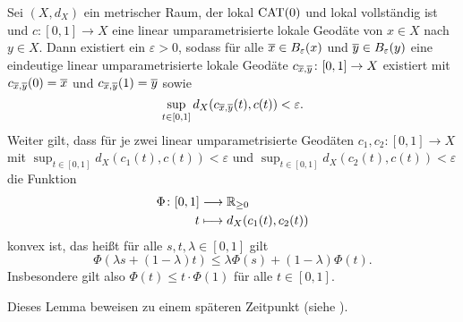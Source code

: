 \begin{lemma}
\label{lemma:2.32}
	Sei $(X,d_X)$ ein metrischer Raum, der lokal $\operatorname{CAT(0)}$ und lokal vollständig ist und $c \colon [0,1] \rightarrow X$ eine linear umparametrisierte lokale Geodäte von $x \in X$ nach $y \in X$.
	Dann existiert ein $\varepsilon > 0$, sodass für alle $\overline{x} \in B_\varepsilon(x)$ und $\overline{y} \in B_\varepsilon(y)$ eine eindeutige linear umparametrisierte lokale Geodäte $c_{\overline{x},\overline{y}} \colon [0,1] \rightarrow X$ existiert mit $c_{\overline{x},\overline{y}}(0) = \overline{x}$ und $c_{\overline{x},\overline{y}}(1) = \overline{y}$ sowie
	\[
		\sup_{t \in [0,1]} d_X(c_{\overline{x},\overline{y}}(t),c(t)) < \varepsilon.
	\]
	Weiter gilt, dass für je zwei linear umparametrisierte Geodäten $c_1,c_2 \colon [0,1] \rightarrow X$ mit $\sup_{t \in [0,1]} d_X(c_1(t),c(t)) < \varepsilon$ und $\sup_{t \in [0,1]} d_X(c_2(t),c(t)) < \varepsilon$ die Funktion
	\begin{align*}
		\Phi\colon [0,1] &\longrightarrow \mathbb{R}_{\geq 0} \\
		t &\longmapsto d_X(c_1(t),c_2(t))
	\end{align*}
	konvex ist, das heißt für alle $s,t,\lambda \in [0,1]$ gilt
	\[
		\Phi(\lambda s + (1-\lambda)t) \leq \lambda \Phi(s) + (1-\lambda)\Phi(t).
	\]
	Insbesondere gilt also $\Phi(t) \leq t \cdot \Phi(1)$ für alle $t \in [0,1]$.
\end{lemma}

Dieses Lemma beweisen zu einem späteren Zeitpunkt (siehe \pageref{bew_tech_lemma}). 

